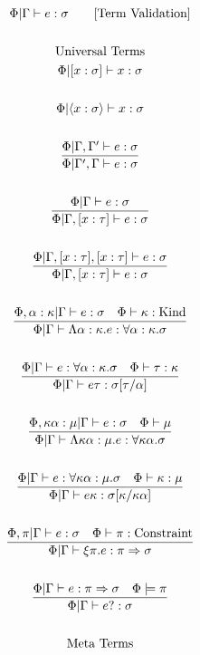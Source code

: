 \documentclass {article}
\begin{document}
\begin{gather*}
\Phi | \Gamma \vdash e : \sigma \tag* {[\text{Term Validation}]}  \\
\\
\text{Universal Terms}
\\
\Phi | [x : \sigma] \vdash x : \sigma \\
\\
\Phi | \langle x : \sigma \rangle \vdash x : \sigma \\
\\
\frac
{\Phi | \Gamma, \Gamma' \vdash e : \sigma}
{\Phi | \Gamma', \Gamma \vdash e : \sigma} \\
\\
\frac
{\Phi | \Gamma \vdash e : \sigma}
{\Phi | \Gamma, [ x : \tau ] \vdash e : \sigma } \\
\\
\frac
{\Phi | \Gamma, [x : \tau], [x : \tau] \vdash e : \sigma}
{\Phi | \Gamma, [x : \tau] \vdash e : \sigma } \\
\\
\frac
{\Phi, \alpha : \kappa | \Gamma \vdash e : \sigma \quad \Phi \vdash \kappa : \text{Kind}}
{\Phi | \Gamma \vdash \Lambda \alpha : \kappa. e : \forall \alpha : \kappa. \sigma } \\
\\
\frac
{\Phi | \Gamma \vdash e : \forall \alpha : \kappa. \sigma \quad \Phi \vdash \tau : \kappa }
{\Phi | \Gamma \vdash e \tau : \sigma [\tau/\alpha] } \\
\\
\frac
{\Phi, \kappa \alpha : \mu | \Gamma \vdash e : \sigma \quad \Phi \vdash \mu}
{\Phi | \Gamma \vdash \Lambda \kappa \alpha : \mu. e : \forall \kappa \alpha. \sigma} \\
\\
\frac
{\Phi | \Gamma \vdash e : \forall \kappa \alpha : \mu. \sigma \quad \Phi \vdash \kappa : \mu}
{\Phi | \Gamma \vdash e \kappa : \sigma [\kappa/\kappa \alpha]} \\
\\
\frac
{\Phi, \pi | \Gamma \vdash e : \sigma \quad \Phi \vdash \pi : \text{Constraint}}
{\Phi | \Gamma \vdash \xi \pi. e : \pi \Rightarrow \sigma} \\
\\
\frac
{\Phi | \Gamma \vdash e : \pi \Rightarrow \sigma \quad \Phi \models \pi }
{\Phi | \Gamma \vdash e? : \sigma} \\
\\
\text{Meta Terms} \\
\\

\end{gather*}
\end{document}
